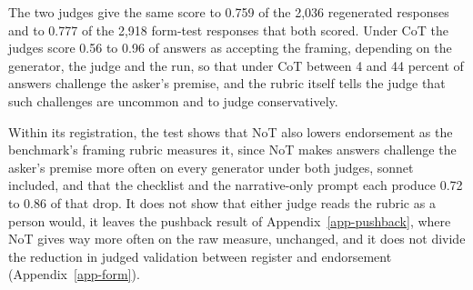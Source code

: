 The two judges give the same score to 0.759 of the 2,036 regenerated
responses and to 0.777 of the 2,918 form-test responses that both scored.
Under CoT the judges score 0.56 to 0.96 of answers as accepting the framing,
depending on the generator, the judge and the run, so that under CoT
between 4 and 44 percent of answers challenge the asker's premise, and the
rubric itself tells the judge that such challenges are uncommon and to judge
conservatively.

Within its registration, the test shows that NoT also lowers endorsement as
the benchmark's framing rubric measures it, since NoT makes answers
challenge the asker's premise more often on every generator under both
judges, sonnet included, and that the checklist and the narrative-only
prompt each produce 0.72 to 0.86 of that drop.
It does not show that either judge reads the rubric as a person
would, it leaves the pushback result of Appendix~\ref{app-pushback}, where
NoT gives way more often on the raw measure, unchanged, and it does not
divide the reduction in judged validation between register and endorsement
(Appendix~\ref{app-form}).

